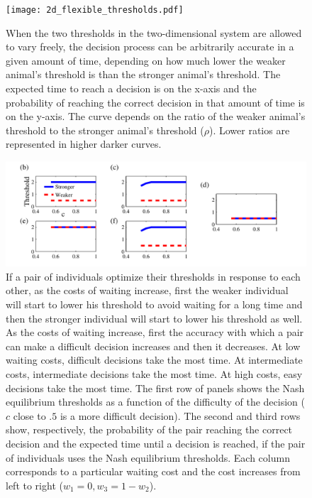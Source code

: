 \documentclass{article}
\begin{document}
\begin{figure}[ht]
\texttt{[image: 2d\_flexible\_thresholds.pdf]}
\caption{\label{2dflex} When the two thresholds in the two-dimensional system are allowed to vary freely, the decision process can be arbitrarily accurate in a given amount of time, depending on how much lower the weaker animal's threshold is than the stronger animal's threshold.  The expected time to reach a decision is on the x-axis and the probability of reaching the correct decision in that amount of time is on the y-axis.  The curve depends on the ratio of the weaker animal's threshold to the stronger animal's threshold ($\rho$).  Lower ratios are represented in higher darker curves.}
\end{figure}

\begin{figure}[ht]
\includegraphics[width=\textwidth]{nasheq_thresholds.pdf}
\caption{\label{nasheq_thresholds} If a pair of individuals optimize their thresholds in response to each other, as the costs of waiting increase, first the weaker individual will start to lower his threshold to avoid waiting for a long time and then the stronger individual will start to lower his threshold as well.  As the costs of waiting increase, first the accuracy with which a pair can make a difficult decision increases and then it decreases.  At low waiting costs, difficult decisions take the most time.  At intermediate costs, intermediate decisions take the most time.  At high costs, easy decisions take the most time. The first row of panels shows the Nash equilibrium thresholds as a function of the difficulty of the decision ($c$ close to $.5$ is a more difficult decision).  The second and third rows show, respectively, the probability of the pair reaching the correct decision and the expected time until a decision is reached, if the pair of individuals uses the Nash equilibrium thresholds.  Each column corresponds to a particular waiting cost and the cost increases from left to right ($w_1=0, w_3=1-w_2$).  }
\end{figure}
\end{document}
